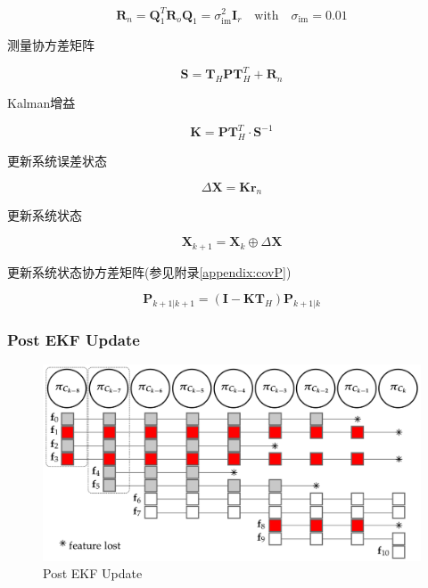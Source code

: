 \documentclass[12pt,a4paper]{article}
\begin{document}
\begin{equation}
\mathbf{R}_{n}=
\mathbf{Q}_{1}^{T} \mathbf{R}_{o} \mathbf{Q}_{1}=\sigma_{\mathrm{im}}^{2} \mathbf{I}_{r}
\quad \text{with} \quad
\sigma_{\mathrm{im}} = 0.01
\end{equation}

测量协方差矩阵

\begin{equation}
\mathbf{S} = \mathbf{T}_{H} \mathbf{P} \mathbf{T}_{H}^{T}+\mathbf{R}_{n}
\end{equation}

Kalman增益

\begin{equation}
\mathbf{K}=\mathbf{P} \mathbf{T}_{H}^{T} \cdot \mathbf{S}^{-1}
\end{equation}

更新系统误差状态

\begin{equation}
\Delta \mathbf{X}=\mathbf{K r}_{n}
\end{equation}

更新系统状态

\begin{equation}
\mathbf{X}_{k+1} = \mathbf{X}_k \oplus \Delta \mathbf{X}
\end{equation}

更新系统状态协方差矩阵(参见附录\ref{appendix:covP})

\begin{equation}
\mathbf{P}_{k+1 | k+1}=
\left(\mathbf{I}-\mathbf{K} \mathbf{T}_{H}\right) \mathbf{P}_{k+1 | k}
\end{equation}

\subsubsection{Post EKF Update}

\begin{figure}[H]
	\centering
	\includegraphics[scale=0.45]{images/post_ekf_update.png}
	\caption{Post EKF Update}
\end{figure}
\end{document}
